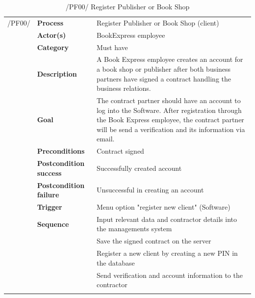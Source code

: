 \documentclass[11pt,a4paper,oneside,svgnames]{report}
\begin{document}
\begin{table}[H]
\centering
\begin{tabular}{p{1.5cm}p{3cm}p{8cm}}
\cellcolor{white}/PF00/	& \textbf{Process}	& Register Publisher or Book Shop (client)\\
\cellcolor{white}		& \textbf{Actor(s)} & BookExpress employee\\
\cellcolor{white}		& \textbf{Category} & Must have\\
\cellcolor{white}		& \textbf{Description}	 & A Book Express employee creates an account for a book shop or publisher after both business partners have signed a contract handling the business relations.\\
\cellcolor{white}		& \textbf{Goal} & The contract partner should have an account to log into the Software. After registration through the Book Express employee, the contract partner will be send a verification and its information via email.\\
\cellcolor{white}		& \textbf{Preconditions} & Contract signed\\
\cellcolor{white}		& \textbf{Postcondition success} & Successfully created account\\
\cellcolor{white}		& \textbf{Postcondition failure} & Unsuccessful in creating an account\\
\cellcolor{white}		& \textbf{Trigger} & Menu option "register new client" (Software)\\
\cellcolor{white}		& \textbf{Sequence} & Input relevant data and contractor details into the managements system\\
\cellcolor{white}		& & Save the signed contract on the server\\
\cellcolor{white}		& & Register a new client by creating a new PIN in the database\\
\cellcolor{white}		& & Send verification and account information to the contractor\\
\cellcolor{white}\hfill \\		
\end{tabular}
\caption{/PF00/ Register Publisher or Book Shop}
\label{tab:pf00}
\end{table}
\end{document}
